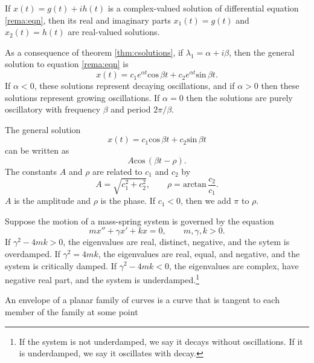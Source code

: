 \documentclass[nobib,notoc]{tufte-handout}
\begin{document}
\begin{thm}
	\label{thm:csolutions}
If \(x(t)=g(t)+ih(t)\) is a complex-valued solution of differential equation \ref{rema:eqn}, then its real and imaginary parts \(x_1(t)=g(t)\) and \(x_2(t)=h(t)\) are real-valued solutions.
\end{thm}
\begin{rema}
	As a consequence of theorem \ref{thm:csolutions}, if \(\lambda_1=\alpha+i\beta\), then the general solution to equation \ref{rema:eqn} is
	\begin{equation*}
		x(t)=c_1e^{\alpha t}\text{cos}\,\beta t+c_2e^{\alpha t}\text{sin}\,\beta t.
	\end{equation*}
	If \(\alpha<0\), these solutions represent decaying oscillations, and if \(\alpha>0\) then these solutions represent growing oscillations. If \(\alpha=0\) then the solutions are purely oscillatory with frequency \(\beta\) and period \(2\pi/\beta\).
\end{rema}
\begin{defi}
	The general solution
	\begin{equation*}
		x(t)=c_1\text{cos}\,\beta t+c_2\text{sin}\,\beta t
	\end{equation*}
	can be written as
	\begin{equation*}
		A\text{cos}\,(\beta t-\rho).
	\end{equation*}
	The constants \(A\) and \(\rho\) are related to \(c_1\) and \(c_2\) by
	\begin{equation*}
		A=\sqrt{c_1^2+c_2^2},\qquad\rho=\text{arctan}\,\frac{c_2}{c_1}.
	\end{equation*}
	\(A\) is the amplitude and \(\rho\) is the phase. If \(c_1<0\), then we add \(\pi\) to \(\rho\).
\end{defi}
\begin{defi}[Damping]
	Suppose the motion of a mass-spring system is governed by the equation
	\begin{equation*}
		mx''+\gamma x'+kx=0,\qquad m,\gamma,k>0.
	\end{equation*}
	If \(\gamma^2-4mk>0\), the eigenvalues are real, distinct, negative, and the sytem is overdamped. If \(\gamma^2=4mk\), the eigenvalues are real, equal, and negative, and the system is critically damped. If \(\gamma^2-4mk<0\), the eigenvalues are complex, have negative real part, and the system is underdamped.\footnote{If the system is not underdamped, we say it decays without oscillations. If it is underdamped, we say it oscillates with decay.}
\end{defi}
\begin{defi}[Envelope]
	An envelope of a planar family of curves is a curve that is tangent to each member of the family at some point
\end{defi}
\end{document}
